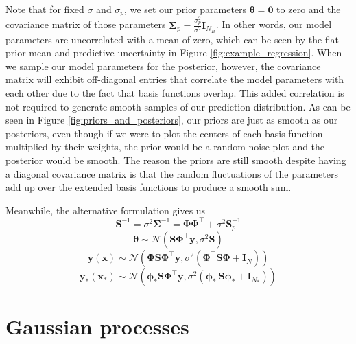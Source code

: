 \documentclass{article}
\begin{document}
Note that for fixed $\sigma$ and $\sigma_p$, we set our prior parameters $\boldsymbol{\theta}=\mathbf{0}$ to zero and the covariance matrix of those parameters $\boldsymbol{\Sigma}_p=\frac{\sigma_p^2}{\sigma^2}\mathbf{I}_{N_B}$. In other words, our model parameters are uncorrelated with a mean of zero, which can be seen by the flat prior mean and predictive uncertainty in Figure \ref{fig:example_regression}. When we sample our model parameters for the posterior, however, the covariance matrix will exhibit off-diagonal entries that correlate the model parameters with each other due to the fact that basis functions overlap. This added correlation is not required to generate smooth samples of our prediction distribution. As can be seen in Figure \ref{fig:priors_and_posteriors}, our priors are just as smooth as our posteriors, even though if we were to plot the centers of each basis function multiplied by their weights, the prior would be a random noise plot and the posterior would be smooth. The reason the priors are still smooth despite having a diagonal covariance matrix is that the random fluctuations of the parameters add up over the extended basis functions to produce a smooth sum.

Meanwhile, the alternative formulation gives us 
\begin{equation}
\label{eq:define_S}
    \mathbf{S}^{-1} = \sigma^2\boldsymbol{\Sigma}^{-1}=\boldsymbol{\Phi \Phi}^\top + \sigma^2\mathbf{S}_p^{-1}
\end{equation}
\begin{equation}
\label{theta_distribution}
    \boldsymbol{\theta}\sim\mathcal{N}( \mathbf{S} \boldsymbol{\Phi}^\top \mathbf{y},\sigma^2\mathbf{S})
\end{equation} 
\begin{equation}
\label{BLR_posterior}
    \mathbf{y}(\mathbf{x})\sim\mathcal{N}\left(\boldsymbol{\Phi}  \mathbf{S} \boldsymbol{\Phi}^\top\mathbf{y} ,\sigma^2\left(\boldsymbol{\Phi}^\top\mathbf{S}\boldsymbol{\Phi}+\mathbf{I}_N\right)\right)
\end{equation} 
\begin{equation}
\label{BLR_posterior}
    \mathbf{y_\ast}(\mathbf{x}_\ast)\sim\mathcal{N}\left(\boldsymbol{\phi}_\ast  \mathbf{S} \boldsymbol{\Phi}^\top\mathbf{y} ,\sigma^2\left(\boldsymbol{\phi}^\top_\ast \mathbf{S}\boldsymbol{\phi}_\ast+ \mathbf{I}_{N_\ast}\right)\right)
\end{equation} 

\section{Gaussian processes}
\end{document}

